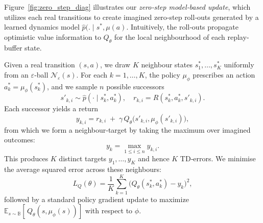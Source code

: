 \documentclass[11pt,a4paper]{report}
\newcommand\myworries[1]{\textcolor{red}{#1}}
\begin{document}
Figure~\ref{fig:zero_step_diag} illustrates our \emph{zero‐step model‐based update}, which utilizes each real transitions to create imagined zero‐step roll‐outs generated by a learned dynamics model \(\hat p(.\mid s^*,\mu(a)\). Intuitively, the roll‐outs propagate optimistic value information to \(Q_\theta\) for the local neighbourhood of each replay‐buffer state.

Given a real transition \((s,a)\), we draw \(K\) neighbour states \(s^*_1,\dots,s^*_K\) uniformly from an \(\varepsilon\)‐ball \(\mathcal N_{\varepsilon}(s)\). For each \(k=1,\dots,K\), the policy \(\mu_\phi\) prescribes an action \(a^*_k=\mu_\phi(s^*_k)\), and we sample \(n\) possible successors 
\[
  s'_{k,i}\sim\hat p(\cdot\mid s^*_k,a^*_k),
  \quad
  r_{k,i}=R(s^*_k,a^*_k,s'_{k,i}).
\]
Each successor yields a return
\[
  y_{k,i}
  = r_{k,i} \;+\;\gamma\,Q_\theta\bigl(s'_{k,i},\mu_\phi(s'_{k,i})\bigr),
\]
from which we form a neighbour‐target by taking the maximum over imagined outcomes:
\[
  y_k = \max_{1\le i\le n} y_{k,i}.
\]
This produces \(K\) distinct targets \(y_1,\dots,y_K\) and hence \(K\) TD‐errors. We minimise the average squared error across these neighbours:
\[
  L_Q(\theta)
  = \frac{1}{K}\sum_{k=1}^K \bigl(Q_\theta(s^{*}_k, a^{*}_k) - y_k\bigr)^{2},
\]
followed by a standard policy gradient update to maximize \(\mathbb E_{s\sim\mathbb B}[\,Q_\theta(s,\mu_\phi(s))]\) with respect to \(\phi\).

\end{document}
